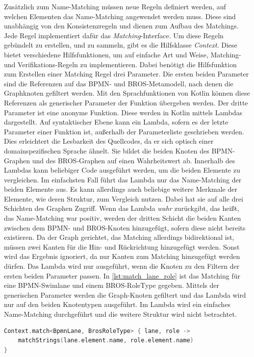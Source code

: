 Zusätzlich zum Name-Matching müssen neue Regeln definiert werden, auf welchen Elementen das Name-Matching angewendet werden muss.
Diese sind unabhängig von den Konsistenzregeln und dienen zum Aufbau des Matchings.
Jede Regel implementiert dafür das \emph{Matching}-Interface.
Um diese Regeln gebündelt zu erstellen, und zu sammeln, gibt es die Hilfsklasse \emph{Context}.
Diese bietet verschiedene Hilfsfunktionen, um auf einfache Art und Weise, Matching- und Verifikations-Regeln zu implementieren.
Dabei benötigt die Hilfsfunktion zum Erstellen einer Matching Regel drei Parameter.
Die ersten beiden Parameter sind die Referenzen auf das BPMN- und BROS-Metamodell, nach denen die Graphknoten gefiltert werden.
Mit den Sprachfunktionen von Kotlin können diese Referenzen als generischer Parameter der Funktion übergeben werden.
Der dritte Parameter ist eine anonyme Funktion.
Diese werden in Kotlin mittels Lambdas dargestellt.
Auf syntaktischer Ebene kann ein Lambda, sofern es der letzte Parameter einer Funktion ist, außerhalb der Parameterliste geschrieben werden.
Dies erleichtert die Lesbarkeit des Quellcodes, da er sich optisch einer domainspezifischen Sprache ähnelt.
Sie bildet die beiden Knoten des BPMN-Graphen und des BROS-Graphen auf einen Wahrheitswert ab.
Innerhalb des Lambdas kann beliebiger Code ausgeführt werden, um die beiden Elemente zu vergleichen.
Im einfachsten Fall führt das Lambda nur das Name-Matching der beiden Elemente aus.
Es kann allerdings auch beliebige weitere Merkmale der Elemente, wie deren Struktur, zum Vergleich nutzen.
Dabei hat sie auf alle drei Schichten des Graphen Zugriff.
Wenn das Lambda \emph{wahr} zurückgibt, das heißt, das Name-Matching war positiv, werden der dritten Schicht die beiden Kanten zwischen dem BPMN- und BROS-Knoten hinzugefügt, sofern diese nicht bereits existieren.
Da der Graph gerichtet, das Matching allerdings bidirektional ist, müssen zwei Kanten für die Hin- und Rückrichtung hinzugefügt werden.
Sonst wird das Ergebnis ignoriert, da nur Kanten zum Matching hinzugefügt werden dürfen.
Das Lambda wird nur ausgeführt, wenn die Knoten zu den Filtern der ersten beiden Parameter passen.
In \cref{lst:match_lane_role} ist das Matching für eine BPMN-Swimlane und einem BROS-RoleType gegeben.
Mittels der generischen Parameter werden die Graph-Knoten gefiltert und das Lambda wird nur auf den beiden Knotentypen ausgeführt. 
Im Lambda wird ein einfaches Name-Matching durchgeführt und die weitere Struktur wird nicht betrachtet.

\begin{lstlisting}[language=Kotlin, caption=Matching Regel von einer BPMN-SwimLane und einem BROS-RoleType, label=lst:match_lane_role]
Context.match<BpmnLane, BrosRoleType> { lane, role ->
    matchStrings(lane.element.name, role.element.name)
}
\end{lstlisting}


